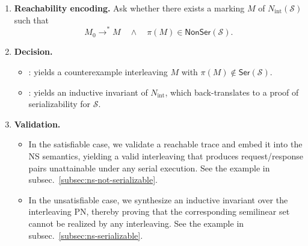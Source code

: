 \begin{enumerate}
	\item \textbf{Reachability encoding.}  
	Ask whether there exists a marking \(M\) of \(N_{\mathrm{int}}(\mathcal S)\) such that
	\[
	M_0 \xrightarrow{}^{*} M
	\quad\wedge\quad
	\pi(M)\in \mathsf{NonSer}(\mathcal S).
	\]
	
	\item \textbf{Decision.}  
	\begin{itemize}
		\item [\sat]: yields a counterexample interleaving \(M\) with
		\(\pi(M)\notin \mathsf{Ser}(\mathcal S)\).
		\item [\unsat]: yields an inductive invariant of
		\(N_{\mathrm{int}}\), which back-translates to a proof of
		serializability for \(\mathcal S\).
	\end{itemize}



\item \textbf{Validation.}  

	\begin{itemize}
		
		\item[\sat] In the satisfiable case, we validate a reachable trace and embed it into the NS semantics, yielding a valid interleaving that produces request/response pairs unattainable under any serial execution.
		See the example in subsec.~\ref{subsec:ns-not-serializable}.
		
		\item[\unsat] In the unsatisfiable case, we synthesize an inductive invariant over the interleaving PN, thereby proving that the corresponding semilinear set cannot be realized by any interleaving.
		See the example in subsec.~\ref{subsec:ns-serializable}.
		
		
	
\end{itemize}

\end{enumerate}

